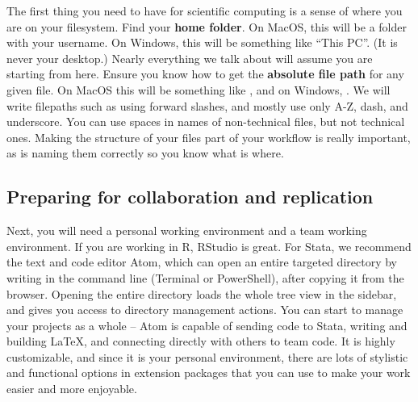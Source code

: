 The first thing you need to have for scientific computing
is a sense of where you are on your filesystem.
Find your \textbf{home folder}. On MacOS, this will be a folder with your username.
On Windows, this will be something like ``This PC''. (It is never your desktop.)
Nearly everything we talk about will assume you are starting from here.
Ensure you know how to get the \textbf{absolute file path} for any given file.
On MacOS this will be something like ,
and on Windows, .
We will write filepaths such as 
using forward slashes, and mostly use only A-Z, dash, and underscore.
You can use spaces in names of non-technical files, but not technical ones.
Making the structure of your files part of your workflow is really important,
as is naming them correctly so you know what is where.

\subsection{Preparing for collaboration and replication}

Next, you will need a personal working environment and a team working environment.
If you are working in R, RStudio is great.
For Stata, we recommend the text and code editor Atom,
which can open an entire targeted directory by writing 
in the command line (Terminal or PowerShell), after copying it from the browser.
Opening the entire directory loads the whole tree view in the sidebar,
and gives you access to directory management actions.
You can start to manage your projects as a whole --
Atom is capable of sending code to Stata,
writing and building \LaTeX,
and connecting directly with others to team code.
It is highly customizable, and since it is your personal environment,
there are lots of stylistic and functional options in extension packages
that you can use to make your work easier and more enjoyable.

